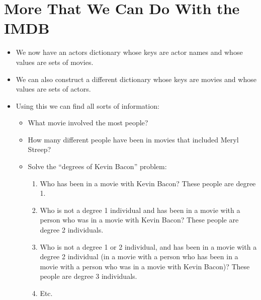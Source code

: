 \documentclass[letterpaper,10pt,english]{sphinxmanual}
\begin{document}
\section{More That We Can Do With the IMDB}
\label{\detokenize{lecture_notes/lec17_dictionaries2:more-that-we-can-do-with-the-imdb}}\begin{itemize}
\item {} 
We now have an actors dictionary whose keys are actor names and
whose values are sets of movies.

\item {} 
We can also construct a different dictionary whose keys are movies
and whose values are sets of actors.

\item {} 
Using this we can find all sorts of information:
\begin{itemize}
\item {} 
What movie involved the most people?

\item {} 
How many different people have been in movies that included
Meryl Streep?

\item {} 
Solve the “degrees of Kevin Bacon” problem:
\begin{enumerate}
\def\theenumi{\arabic{enumi}}
\def\labelenumi{\theenumi .}
\makeatletter\def\p@enumii{\p@enumi \theenumi .}\makeatother
\item {} 
Who has been in a movie with Kevin Bacon? These people are
degree 1.

\item {} 
Who is not a degree 1 individual and has been in a movie with
a person who was in a movie with Kevin Bacon? These people
are degree 2 individuals.

\item {} 
Who is not a degree 1 or 2 individual, and has been in a
movie with a degree 2 individual (in a movie with a person
who has been in a movie with a person who was in a movie with
Kevin Bacon)? These people are degree 3 individuals.

\item {} 
Etc.

\end{enumerate}

\end{itemize}

\end{itemize}
\end{document}
